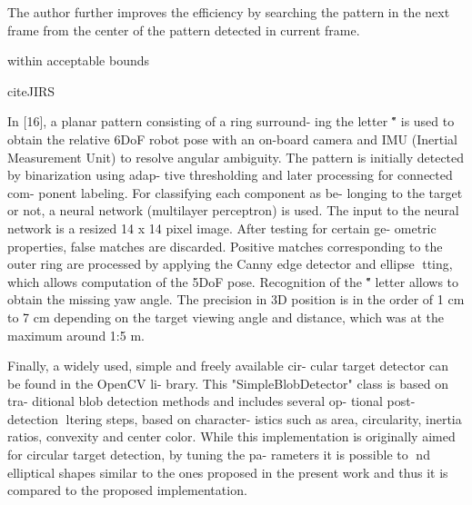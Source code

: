 \documentclass[a4paper]{report}
\begin{document}

The author further improves the efficiency by searching the pattern in the next frame from the center of the pattern detected in current frame. 






within acceptable bounds


cite{JIRS}

In [16], a planar pattern consisting of a ring surround-
ing the letter \H" is used to obtain the relative 6DoF
robot pose with an on-board camera and IMU (Inertial
Measurement Unit) to resolve angular ambiguity. The
pattern is initially detected by binarization using adap-
tive thresholding and later processing for connected com-
ponent labeling. For classifying each component as be-
longing to the target or not, a neural network (multilayer
perceptron) is used. The input to the neural network is a
resized 14 x 14 pixel image. After testing for certain ge-
ometric properties, false matches are discarded. Positive
matches corresponding to the outer ring are processed
by applying the Canny edge detector and ellipse tting,
which allows computation of the 5DoF pose. Recognition
of the \H" letter allows to obtain the missing yaw angle.
The precision in 3D position is in the order of 1 cm to
7 cm depending on the target viewing angle and distance,
which was at the maximum around 1:5 m.

Finally, a widely used, simple and freely available cir-
cular target detector can be found in the OpenCV li-
brary. This "SimpleBlobDetector" class is based on tra-
ditional blob detection methods and includes several op-
tional post-detection ltering steps, based on character-
istics such as area, circularity, inertia ratios, convexity
and center color. While this implementation is originally
aimed for circular target detection, by tuning the pa-
rameters it is possible to nd elliptical shapes similar
to the ones proposed in the present work and thus it is
compared to the proposed implementation.
\end{document}
